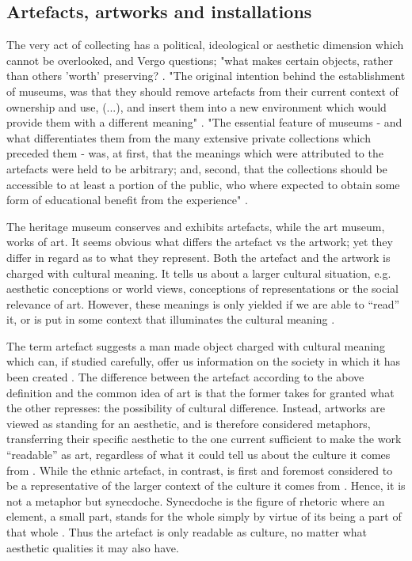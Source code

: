 \subsection{Artefacts, artworks and installations}
The very act of collecting has a political, ideological or aesthetic dimension which cannot be overlooked, and Vergo questions; "what makes certain objects, rather than others 'worth' preserving? \autocite[p. 2]{vergo_museology_1989}. "The original intention behind the establishment of museums, was that they should remove artefacts from their current context of ownership and use, (...), and insert them into a new environment which would provide them with a different meaning" \autocite[p. 6]{vergo_museology_1989}. "The essential feature of museums - and what differentiates them from the many extensive private collections which preceded them - was, at first, that the meanings which were attributed to the artefacts were held to be arbitrary; and, second, that the collections should be accessible to at least a portion of the public, who where expected to obtain some form of educational benefit from the experience" \autocite[p. 6]{vergo_museology_1989}.

The heritage museum conserves and exhibits artefacts, while the art museum, works of art. It seems obvious what differs the artefact vs the artwork; yet they differ in regard as to what they represent. Both the artefact and the artwork is charged with cultural meaning. It tells us about a larger cultural situation, e.g. aesthetic conceptions or world views, conceptions of representations or the social relevance of art. However, these meanings is only yielded if we are able to “read” it, or is put in some context that illuminates the cultural meaning \autocite[p. 206]{Thi_book}.

The term artefact suggests a man made object charged with cultural meaning which can, if studied carefully, offer us information on the society in which it has been created \autocite[p. 205]{Thi_book}. The difference between the artefact according to the above definition and the common idea of art is that the former takes for granted what the other represses: the possibility of cultural difference. Instead, artworks are viewed as standing for an aesthetic, and is therefore considered metaphors, transferring their specific aesthetic to the one current sufficient to make the work “readable” as art, regardless of what it could tell us about the culture it comes from \autocite[p. 206]{Thi_book}. While the ethnic artefact, in contrast, is first and foremost considered to be a representative of the larger context of the culture it comes from \autocite[p. 206]{Thi_book}. Hence, it is not a metaphor but synecdoche. Synecdoche is the figure of rhetoric where an element, a small part, stands for the whole simply by virtue of its being a part of that whole \autocite[p. 206]{Thi_book}. Thus the artefact is only readable as culture, no matter what aesthetic qualities it may also have.


